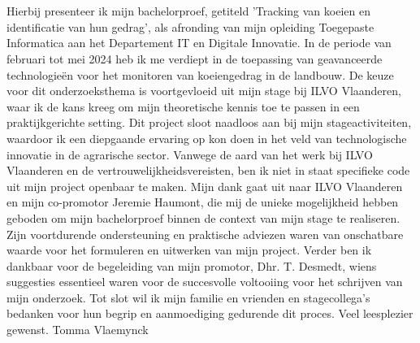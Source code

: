 
\chapter*{}%
\label{ch:voorwoord}

Hierbij presenteer ik mijn bachelorproef, getiteld 'Tracking van koeien en identificatie van hun gedrag', als afronding van mijn opleiding Toegepaste Informatica aan het Departement IT en Digitale Innovatie. In de periode van februari tot mei 2024 heb ik me verdiept in de toepassing van geavanceerde technologieën voor het monitoren van koeiengedrag in de landbouw.
\newline\newline
De keuze voor dit onderzoeksthema is voortgevloeid uit mijn stage bij ILVO Vlaanderen, waar ik de kans kreeg om mijn theoretische kennis toe te passen in een praktijkgerichte setting. Dit project sloot naadloos aan bij mijn stageactiviteiten, waardoor ik een diepgaande ervaring op kon doen in het veld van technologische innovatie in de agrarische sector. Vanwege de aard van het werk bij ILVO Vlaanderen en de vertrouwelijkheidsvereisten, ben ik niet in staat specifieke code uit mijn project openbaar te maken.
\newline\newline
Mijn dank gaat uit naar ILVO Vlaanderen en mijn co-promotor Jeremie Haumont, die mij de unieke mogelijkheid hebben geboden om mijn bachelorproef binnen de context van mijn stage te realiseren. Zijn voortdurende ondersteuning en praktische adviezen waren van onschatbare waarde voor het formuleren en uitwerken van mijn project.
\newline\newline
Verder ben ik dankbaar voor de begeleiding van mijn promotor, Dhr. T. Desmedt, wiens suggesties essentieel waren voor de succesvolle voltooiing voor het schrijven van mijn onderzoek.
\newline\newline
Tot slot wil ik mijn familie en vrienden en stagecollega's bedanken voor hun begrip en aanmoediging gedurende dit proces.
\newline\newline
Veel leesplezier gewenst.
\newline\newline
Tomma Vlaemynck